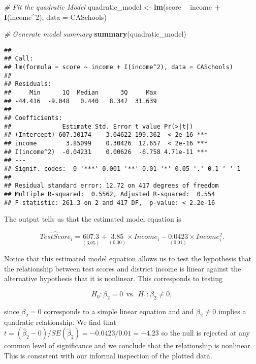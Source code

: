 \documentclass[]{book}
\newenvironment{Shaded}{\begin{snugshade}}{\end{snugshade}}
\newcommand{\KeywordTok}[1]{\textcolor[rgb]{0.13,0.29,0.53}{\textbf{#1}}}
\newcommand{\DataTypeTok}[1]{\textcolor[rgb]{0.13,0.29,0.53}{#1}}
\newcommand{\DecValTok}[1]{\textcolor[rgb]{0.00,0.00,0.81}{#1}}
\newcommand{\StringTok}[1]{\textcolor[rgb]{0.31,0.60,0.02}{#1}}
\newcommand{\CommentTok}[1]{\textcolor[rgb]{0.56,0.35,0.01}{\textit{#1}}}
\newcommand{\OperatorTok}[1]{\textcolor[rgb]{0.81,0.36,0.00}{\textbf{#1}}}
\newcommand{\NormalTok}[1]{#1}
\theoremstyle{definition}
\theoremstyle{definition}
\theoremstyle{definition}
\theoremstyle{remark}
\begin{document}
\begin{Shaded}
\begin{Highlighting}[]
\CommentTok{# Fit the quadratic Model}
\NormalTok{quadratic_model <-}\StringTok{ }\KeywordTok{lm}\NormalTok{(score }\OperatorTok{~}\StringTok{ }\NormalTok{income }\OperatorTok{+}\StringTok{ }\KeywordTok{I}\NormalTok{(income}\OperatorTok{^}\DecValTok{2}\NormalTok{), }\DataTypeTok{data =}\NormalTok{ CASchools)}

\CommentTok{# Generate model summary}
\KeywordTok{summary}\NormalTok{(quadratic_model)}
\end{Highlighting}
\end{Shaded}

\begin{verbatim}
## 
## Call:
## lm(formula = score ~ income + I(income^2), data = CASchools)
## 
## Residuals:
##     Min      1Q  Median      3Q     Max 
## -44.416  -9.048   0.440   8.347  31.639 
## 
## Coefficients:
##              Estimate Std. Error t value Pr(>|t|)    
## (Intercept) 607.30174    3.04622 199.362  < 2e-16 ***
## income        3.85099    0.30426  12.657  < 2e-16 ***
## I(income^2)  -0.04231    0.00626  -6.758 4.71e-11 ***
## ---
## Signif. codes:  0 '***' 0.001 '**' 0.01 '*' 0.05 '.' 0.1 ' ' 1
## 
## Residual standard error: 12.72 on 417 degrees of freedom
## Multiple R-squared:  0.5562, Adjusted R-squared:  0.554 
## F-statistic: 261.3 on 2 and 417 DF,  p-value: < 2.2e-16
\end{verbatim}

The output tells us that the estimated model equation is

\[ \widehat{TestScore}_i = \underset{(3.05)}{607.3} + \underset{(0.30)}{3.85} \times Income_i - \underset{(0.01)}{0.0423} \times Income_i^2. \]

Notice that this estimated model equation allows us to test the
hypothesis that the relationship between test scores and district income
is linear against the alternative hypothesis that it is nonlinear. This
corresponds to testing

\[ H_0: \beta_2 = 0 \ \ \text{vs.} \ \  H_1: \beta_2\neq0,\]

since \(\beta_2=0\) corresponds to a simple linear equation and and
\(\beta_2\neq0\) implies a quadratic relationship. We find that
\(t=(\hat\beta_2 - 0)/SE(\hat\beta_2) = -0.0423/0.01 = -4.23\) so the
null is rejected at any common level of significance and we conclude
that the relationship is nonlinear. This is consistent with our informal
inspection of the plotted data.
\end{document}
